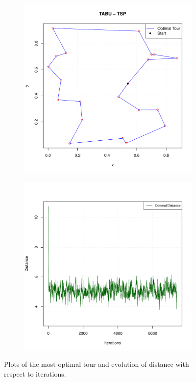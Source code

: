 \begin{figure}[H]
  \centering
  \begin{subfigure}{0.49\textwidth}
    \centering
    \includegraphics[width=\linewidth]{Images/Figures_Exercise_4/opt_tabu.pdf} %
    \caption{}
    \label{fig:opt_tabu}
  \end{subfigure}
  \hfill
  \begin{subfigure}{0.49\textwidth}
    \centering
    \includegraphics[width=\linewidth]{Images/Figures_Exercise_4/distance_iter.pdf} %
    \caption{}
    \label{fig:opt_iter}
  \end{subfigure}
  \caption{Plots of the most optimal tour and evolution of distance with respect to iterations.}
  \label{fig:annealing}
\end{figure}
